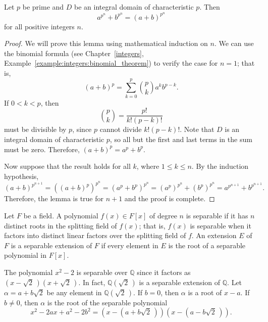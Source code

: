 \begin{lemma}\label{finite:freshmans_dream}
Let $p$ be prime and $D$ be an integral domain of characteristic $p$.  Then
\[
a^{p^n} + b^{p^n} = (a + b)^{p^n}
\]
for all positive integers $n$.  
\end{lemma}

\begin{proof}
We will prove this lemma using mathematical induction on $n$.  We can use the binomial formula (see Chapter~\ref{integers}, Example~\ref{example:integers:binomial_theorem}) to verify the case for $n = 1$; that is,
\[
(a+b)^p 
= 
\sum_{k=0}^{p} 
\binom{p}{k}
a^k b^{p-k}.
\]
If $0 < k < p$, then
\[
\binom{p}{k}
=
\frac{p!}{k!(p-k)!}
\]
must be divisible by $p$, since $p$ cannot divide $k!(p - k)!$.  Note that $D$ is an integral domain of characteristic $p$, so all but the first and last terms in the sum must be zero.  Therefore, $(a + b)^p =
a^p + b^p$.  

Now suppose that the result holds for all $k$, where $1 \leq k \leq n$.  By the induction hypothesis,
\[
(a + b)^{p^{n + 1}}
=
((a + b)^p)^{p^{n}}
=
(a^p + b^p)^{p^{n}}
=
(a^p)^{p^{n}} + (b^p)^{p^{n}}
=
a^{p^{n + 1}} + b^{p^{n + 1}}.
\]
Therefore, the lemma is true for $n + 1$ and the proof is complete.
\end{proof}

\medskip

Let $F$ be a field.  A polynomial $f(x) \in F[x]$ of degree $n$ is {\bfi separable\/} if it has $n$ distinct roots in the splitting field of $f(x)$; that is, $f(x)$ is separable when it factors into distinct linear factors over the splitting field of $f$.  An extension $E$ of $F$ is a {\bfi separable extension\/} of $F$ if every element in $E$ is the root of a separable polynomial in $F[x]$.   


\begin{example}{}
The polynomial $x^2 - 2$ is separable over ${\mathbb Q}$ since it factors as $(x - \sqrt{2}\, )(x + \sqrt{2}\, )$. In fact, ${\mathbb Q}(\sqrt{2}\, )$ is a separable extension of ${\mathbb Q}$.  Let $\alpha =  a + b \sqrt{2}$ be any element in ${\mathbb Q}(\sqrt{2}\, )$. If $b = 0$, then $\alpha$ is a root of $x - a$.  If $b \neq 0$, then $\alpha$ is the root  of the separable polynomial 
\[
x^2 - 2 a x + a^2 - 2 b^2 = (x - (a + b \sqrt{2}\, ))(x - (a - b \sqrt{2}\, )).
\]
\end{example}
 

